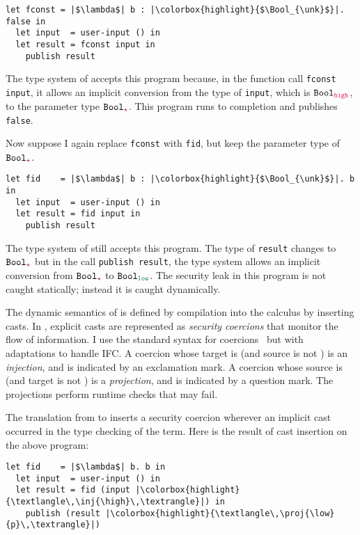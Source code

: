 \begin{lstlisting}[style=tt]
  let fconst = |$\lambda$| b : |\colorbox{highlight}{$\Bool_{\unk}$}|. false in
  let input  = user-input () in
  let result = fconst input in
    publish result
\end{lstlisting}

\noindent The type system of \Surface accepts this program because, in
the function call \texttt{fconst input}, it allows an implicit conversion from
the type of \texttt{input}, which is $\Bool_{\high}$, to the parameter
type $\Bool_{\unk}$. This program runs to completion and publishes
\texttt{false}.

Now suppose I again replace \texttt{fconst} with \texttt{fid}, but keep the
parameter type of $\Bool_{\unk}$.

\begin{lstlisting}[style=tt]
  let fid    = |$\lambda$| b : |\colorbox{highlight}{$\Bool_{\unk}$}|. b in
  let input  = user-input () in
  let result = fid input in
    publish result
\end{lstlisting}

\noindent The type system of \Surface still accepts this program. The type of
\texttt{result} changes to $\Bool_{\unk}$ but in the call \texttt{publish
  result}, the type system allows an implicit conversion from $\Bool_{\unk}$ to
$\Bool_{\low}$. The security leak in this program is not caught statically;
instead it is caught dynamically.

The dynamic semantics of \Surface is defined by compilation into the \CC
calculus by inserting casts. In \CC, explicit casts are represented as
\textit{security coercions} that monitor the flow of information. I use the
standard syntax for coercions~\parencite{Henglein:1994nz} but with adaptations
to handle IFC. A coercion whose target is \unk (and source is not \unk) is an
\emph{injection}, and is indicated by an exclamation mark. A coercion whose
source is \unk (and target is not \unk) is a \emph{projection}, and is indicated
by a question mark. The projections perform runtime checks that may fail.

The translation from \Surface to \CC inserts a security coercion wherever an
implicit cast occurred in the type checking of the \Surface term. Here is the
result of cast insertion on the above program:

\begin{lstlisting}[style=tt]
  let fid    = |$\lambda$| b. b in
  let input  = user-input () in
  let result = fid (input |\colorbox{highlight}{\textlangle\,\inj{\high}\,\textrangle}|) in
    publish (result |\colorbox{highlight}{\textlangle\,\proj{\low}{p}\,\textrangle}|)
\end{lstlisting}

